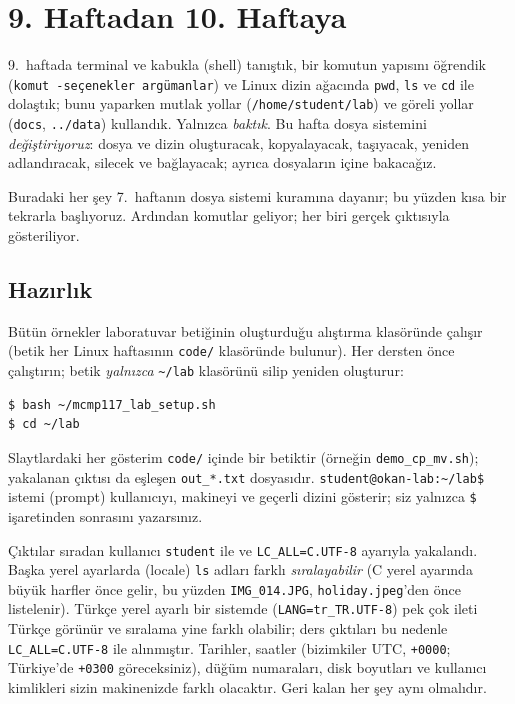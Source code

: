 \documentclass[11pt,a4paper]{article}
\newcommand{\cmd}[1]{\texttt{#1}}
\begin{document}
\setcounter{tocdepth}{1}
\tableofcontents

\section{9. Haftadan 10. Haftaya}

9.~haftada terminal ve kabukla (shell) tanıştık, bir komutun yapısını öğrendik (\texttt{komut}\ \texttt{-seçenekler}\ \texttt{argümanlar}) ve Linux dizin ağacında \cmd{pwd}, \cmd{ls} ve \cmd{cd} ile dolaştık; bunu yaparken mutlak yollar (\texttt{/home/\allowbreak student/\allowbreak lab}) ve göreli yollar (\texttt{docs}, \texttt{../data}) kullandık. Yalnızca \emph{baktık}. Bu hafta dosya sistemini \emph{değiştiriyoruz}: dosya ve dizin oluşturacak, kopyalayacak, taşıyacak, yeniden adlandıracak, silecek ve bağlayacak; ayrıca dosyaların içine bakacağız.

Buradaki her şey 7.~haftanın dosya sistemi kuramına dayanır; bu yüzden kısa bir tekrarla başlıyoruz. Ardından komutlar geliyor; her biri gerçek çıktısıyla gösteriliyor.

\subsection*{Hazırlık}

Bütün örnekler laboratuvar betiğinin oluşturduğu alıştırma klasöründe çalışır (betik her Linux haftasının \cmd{code/} klasöründe bulunur). Her dersten önce çalıştırın; betik \emph{yalnızca} \texttt{\textasciitilde/lab} klasörünü silip yeniden oluşturur:
\begin{lstlisting}[style=term]
$ bash ~/mcmp117_lab_setup.sh
$ cd ~/lab
\end{lstlisting}
Slaytlardaki her gösterim \cmd{code/} içinde bir betiktir (örneğin \cmd{demo\_cp\_mv.sh}); yakalanan çıktısı da eşleşen \cmd{out\_*.txt} dosyasıdır. \texttt{student@okan-lab:\textasciitilde/lab\$} istemi (prompt) kullanıcıyı, makineyi ve geçerli dizini gösterir; siz yalnızca \texttt{\$} işaretinden sonrasını yazarsınız.

\begin{keyidea}
Çıktılar sıradan kullanıcı \texttt{student} ile ve \texttt{LC\_ALL=C.UTF-8} ayarıyla yakalandı. Başka yerel ayarlarda (locale) \cmd{ls} adları farklı \emph{sıralayabilir} (C yerel ayarında büyük harfler önce gelir, bu yüzden \texttt{IMG\_014.JPG}, \texttt{holiday.jpeg}'den önce listelenir). Türkçe yerel ayarlı bir sistemde (\texttt{LANG=tr\_TR.UTF-8}) pek çok ileti Türkçe görünür ve sıralama yine farklı olabilir; ders çıktıları bu nedenle \texttt{LC\_ALL=C.UTF-8} ile alınmıştır. Tarihler, saatler (bizimkiler UTC, \texttt{+0000}; Türkiye'de \texttt{+0300} göreceksiniz), düğüm numaraları, disk boyutları ve kullanıcı kimlikleri sizin makinenizde farklı olacaktır. Geri kalan her şey aynı olmalıdır.
\end{keyidea}
\end{document}
